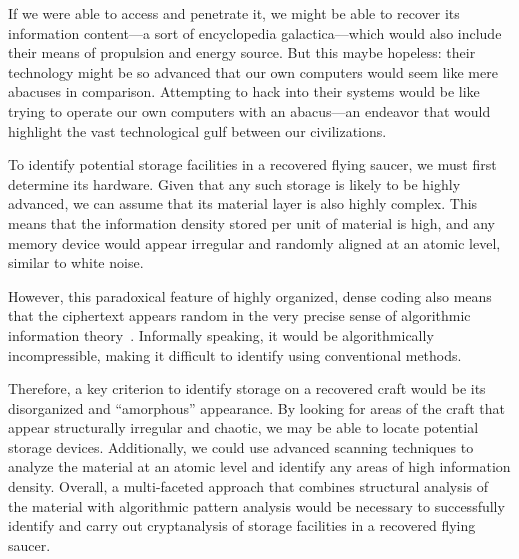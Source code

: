 If we were able to access and penetrate it, we might be able to recover
its information content---a sort of encyclopedia galactica---which would also include their means of propulsion and energy source.
But this maybe hopeless: their technology might be so advanced that our own computers would seem like mere abacuses in comparison.
Attempting to hack into their systems would be like trying to operate our own computers with an abacus---an
endeavor that would highlight the vast technological gulf between our civilizations.



To identify potential storage facilities in a recovered flying saucer, we must first determine its hardware. Given that any such storage is likely to be highly advanced, we can assume that its material layer is also highly complex. This means that the information density stored per unit of material is high, and any memory device would appear irregular and randomly aligned at an atomic level, similar to white noise.

However, this paradoxical feature of highly organized, dense coding also means that the ciphertext appears random in the very precise sense
of algorithmic information theory~\cite{calude:02}. Informally speaking, it would be algorithmically incompressible, making it difficult to identify
using conventional methods.

Therefore, a key criterion to identify storage on a recovered craft would be its disorganized and ``amorphous'' appearance.
By looking for areas of the craft that appear structurally irregular and chaotic, we may be able to locate potential storage devices.
Additionally, we could use advanced scanning techniques to analyze the material at an atomic level and identify any areas of high information density.
Overall, a multi-faceted approach
that combines structural analysis of the material with algorithmic pattern analysis
would be necessary to successfully identify and carry out cryptanalysis of storage facilities in a recovered flying saucer.

